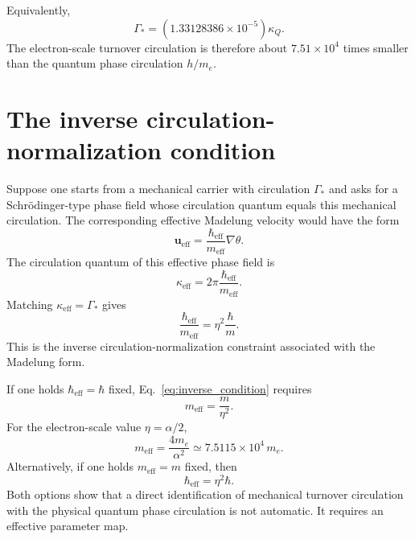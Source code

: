 \documentclass[11pt,a4paper]{article}
\newcommand{\kappaQ}{\kappa_{Q}}
\newcommand{\GammaStar}{\Gamma_{*}}
\newcommand{\hbareff}{\hbar_{\mathrm{eff}}}
\newcommand{\meff}{m_{\mathrm{eff}}}
\begin{document}
Equivalently,
\begin{equation}
    \GammaStar
    =
    \left(1.33128386\times10^{-5}\right)\kappaQ.
\end{equation}
The electron-scale turnover circulation is therefore about $7.51\times10^4$ times smaller than the quantum phase circulation $h/m_e$.

\section{The inverse circulation-normalization condition}

Suppose one starts from a mechanical carrier with circulation $\GammaStar$ and asks for a Schr\"odinger-type phase field whose circulation quantum equals this mechanical circulation. The corresponding effective Madelung velocity would have the form
\begin{equation}
    \mathbf{u}_{\mathrm{eff}}
    =
    \frac{\hbareff}{\meff}\nabla\theta.
\end{equation}
The circulation quantum of this effective phase field is
\begin{equation}
    \kappa_{\mathrm{eff}}
    =
    2\pi\frac{\hbareff}{\meff}.
\end{equation}
Matching $\kappa_{\mathrm{eff}}=\GammaStar$ gives
\begin{equation}
    \boxed{
    \frac{\hbareff}{\meff}
    =
    \eta^2\frac{\hbar}{m}.
    }
    \label{eq:inverse_condition}
\end{equation}
This is the inverse circulation-normalization constraint associated with the Madelung form.

If one holds $\hbareff=\hbar$ fixed, Eq.~\eqref{eq:inverse_condition} requires
\begin{equation}
    \meff=\frac{m}{\eta^2}.
    \label{eq:meff_condition}
\end{equation}
For the electron-scale value $\eta=\alpha/2$,
\begin{equation}
    \meff
    =
    \frac{4m_e}{\alpha^2}
    \simeq
    7.5115\times10^4\,m_e.
    \label{eq:meff_electron}
\end{equation}
Alternatively, if one holds $\meff=m$ fixed, then
\begin{equation}
    \hbareff=\eta^2\hbar.
\end{equation}
Both options show that a direct identification of mechanical turnover circulation with the physical quantum phase circulation is not automatic. It requires an effective parameter map.
\end{document}
